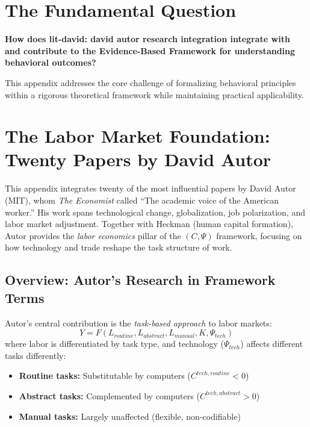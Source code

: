 \section{The Fundamental Question}
\label{sec:aut-fundamental}

\begin{tcolorbox}[
    colback=red!5!white,
    colframe=red!75!black,
    title={\textbf{Fundamental Question}}
]
\textbf{How does lit-david: david autor research integration integrate with and contribute to the
Evidence-Based Framework for understanding behavioral outcomes?}

This appendix addresses the core challenge of formalizing behavioral principles
within a rigorous theoretical framework while maintaining practical applicability.
\end{tcolorbox}




\section{The Labor Market Foundation: Twenty Papers by David Autor}
\label{app:autor}

This appendix integrates twenty of the most influential papers by David Autor
(MIT), whom \emph{The Economist} called ``The academic voice of the American worker.''
His work spans technological change, globalization, job polarization, and
labor market adjustment. Together with Heckman (human capital formation),
Autor provides the \emph{labor economics} pillar of the $(C, \Psi)$ framework,
focusing on how technology and trade reshape the task structure of work.

\subsection{Overview: Autor's Research in Framework Terms}

Autor's central contribution is the \emph{task-based approach} to labor markets:
\begin{equation}
  Y = F(L_{routine}, L_{abstract}, L_{manual}, K, \Psi_{tech})
\end{equation}
where labor is differentiated by task type, and technology ($\Psi_{tech}$)
affects different tasks differently:
\begin{itemize}
  \item \textbf{Routine tasks:} Substitutable by computers ($C^{tech,routine} < 0$)
  \item \textbf{Abstract tasks:} Complemented by computers ($C^{tech,abstract} > 0$)
  \item \textbf{Manual tasks:} Largely unaffected (flexible, non-codifiable)
\end{itemize}

